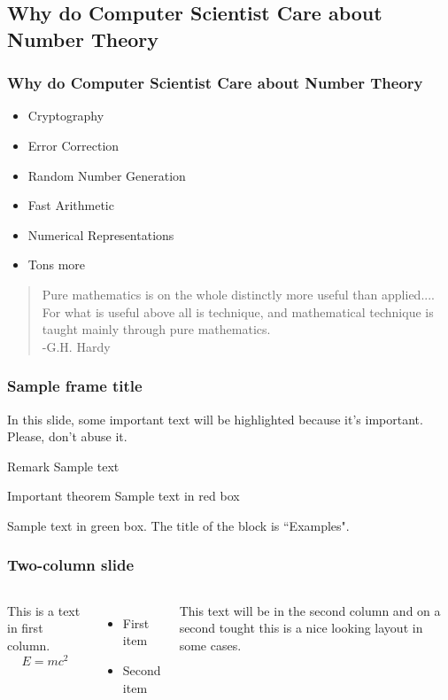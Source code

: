 \documentclass{beamer}
\begin{document}
\subsection{Why do Computer Scientist Care about Number Theory}
\begin{frame}
\frametitle{Why do Computer Scientist Care about Number Theory}
\begin{itemize}
 \item<2-> Cryptography
 \item<3-> Error Correction
 \item<4-> Random Number Generation
 \item<5-> Fast Arithmetic
 \item<6-> Numerical Representations
 \item<7-> Tons more
\end{itemize}
\pause
\begin{block}{}
\begin{quote}
Pure mathematics is on the whole distinctly more useful than applied.... For what is useful above all is technique, and mathematical technique is taught mainly through pure mathematics.
\\-G.H. Hardy
\end{quote}
\end{block}
\end{frame}

\begin{frame}
\frametitle{Sample frame title}

In this slide, some important text will be
\alert{highlighted} because it's important.
Please, don't abuse it.

\begin{block}{Remark}
Sample text
\end{block}

\begin{alertblock}{Important theorem}
Sample text in red box
\end{alertblock}

\begin{examples}
Sample text in green box. The title of the block is ``Examples".
\end{examples}
\end{frame}


\begin{frame}
\frametitle{Two-column slide}

\begin{columns}

This is a text in first column.
$$E=mc^2$$
\begin{itemize}
\item First item
\item Second item
\end{itemize}

This text will be in the second column
and on a second tought this is a nice looking
layout in some cases.
\end{columns}
\end{frame}
\end{document}
